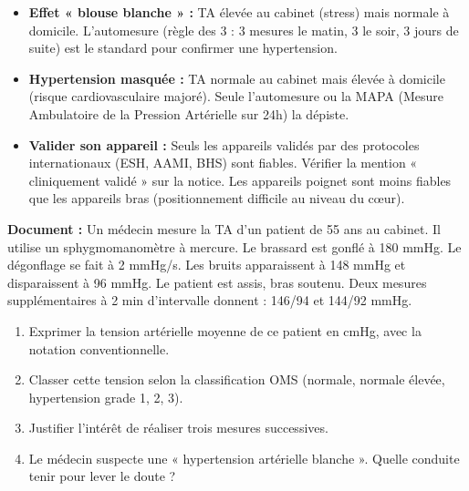 \documentclass[11pt]{article}
\begin{document}
\begin{attention}
\begin{itemize}
    \item \textbf{Effet « blouse blanche » :} TA élevée au cabinet (stress) mais normale à domicile. L'automesure (règle des 3 : 3 mesures le matin, 3 le soir, 3 jours de suite) est le standard pour confirmer une hypertension.
    \item \textbf{Hypertension masquée :} TA normale au cabinet mais élevée à domicile (risque cardiovasculaire majoré). Seule l'automesure ou la MAPA (Mesure Ambulatoire de la Pression Artérielle sur 24h) la dépiste.
    \item \textbf{Valider son appareil :} Seuls les appareils validés par des protocoles internationaux (ESH, AAMI, BHS) sont fiables. Vérifier la mention « cliniquement validé » sur la notice. Les appareils poignet sont moins fiables que les appareils bras (positionnement difficile au niveau du cœur).
\end{itemize}
\end{attention}

\begin{exercice}
\textbf{Document :} Un médecin mesure la TA d'un patient de 55 ans au cabinet. Il utilise un sphygmomanomètre à mercure. Le brassard est gonflé à 180 mmHg. Le dégonflage se fait à 2 mmHg/s. Les bruits apparaissent à 148 mmHg et disparaissent à 96 mmHg. Le patient est assis, bras soutenu. Deux mesures supplémentaires à 2 min d'intervalle donnent : 146/94 et 144/92 mmHg.
\begin{enumerate}
    \item Exprimer la tension artérielle moyenne de ce patient en cmHg, avec la notation conventionnelle.
    \item Classer cette tension selon la classification OMS (normale, normale élevée, hypertension grade 1, 2, 3).
    \item Justifier l'intérêt de réaliser trois mesures successives.
    \item Le médecin suspecte une « hypertension artérielle blanche ». Quelle conduite tenir pour lever le doute ?
\end{enumerate}
\end{exercice}
\end{document}
